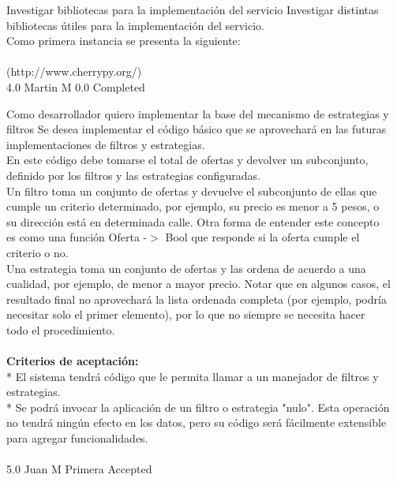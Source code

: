 		{Investigar bibliotecas para la implementación del servicio} %
		{Investigar distintas bibliotecas útiles para la implementación del servicio.\\
Como primera instancia se presenta la siguiente:\\
  \\
[http://www.cherrypy.org/](http://www.cherrypy.org/)\\
} %
		{4.0} %
		{Martin M} %
		{0.0} %
		{Completed} %


\vspace{20pt}

	{Como desarrollador quiero implementar la base del mecanismo de estrategias y filtros} %
	{Se desea implementar el código básico que se aprovechará en las futuras\\
implementaciones de filtros y estrategias.\\
En este código debe tomarse el total de ofertas y devolver un subconjunto,\\
definido por los filtros y  las estrategias configuradas.\\
Un filtro toma un conjunto de ofertas y devuelve el subconjunto de ellas que\\
cumple un criterio determinado, por ejemplo, su precio es menor a 5 pesos, o\\
su dirección está en determinada calle. Otra forma de entender este concepto\\
es como una función Oferta -$>$  Bool que responde si la oferta cumple el\\
criterio o no.\\
Una estrategia toma un conjunto de ofertas y las ordena de acuerdo a una\\
cualidad, por ejemplo, de menor a mayor precio. Notar que en algunos casos, el\\
resultado final no aprovechará la lista ordenada completa (por ejemplo, podría\\
necesitar solo el primer elemento), por lo que no siempre se necesita hacer\\
todo el procedimiento.\\
  \\
\textbf{Criterios de aceptación:}\\
* El sistema tendrá código que le permita llamar a un manejador de filtros y estrategias.  \\
* Se podrá invocar la aplicación de un filtro o estrategia "nulo". Esta operación no tendrá ningún efecto en los datos, pero su código será fácilmente extensible para agregar funcionalidades.  \\
  \\
} %
	{} %
	{5.0} %
	{Juan M} %
	{Primera} %
	{Accepted} %

